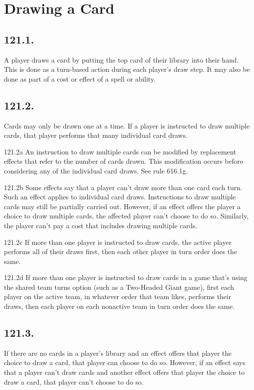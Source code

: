 \section{Drawing a Card}
\subsection*{121.1.}
A player draws a card by putting the top card of their library into their hand. This is done as a turn-based action during each player’s draw step. It may also be done as part of a cost or effect of a spell or ability.

\subsection*{121.2.}
Cards may only be drawn one at a time. If a player is instructed to draw multiple cards, that player performs that many individual card draws.

121.2a An instruction to draw multiple cards can be modified by replacement effects that refer to the number of cards drawn. This modification occurs before considering any of the individual card draws. See rule 616.1g.

121.2b Some effects say that a player can’t draw more than one card each turn. Such an effect applies to individual card draws. Instructions to draw multiple cards may still be partially carried out. However, if an effect offers the player a choice to draw multiple cards, the affected player can’t choose to do so. Similarly, the player can’t pay a cost that includes drawing multiple cards.

121.2c If more than one player is instructed to draw cards, the active player performs all of their draws first, then each other player in turn order does the same.

121.2d If more than one player is instructed to draw cards in a game that’s using the shared team turns option (such as a Two-Headed Giant game), first each player on the active team, in whatever order that team likes, performs their draws, then each player on each nonactive team in turn order does the same.

\subsection*{121.3.}
If there are no cards in a player’s library and an effect offers that player the choice to draw a card, that player can choose to do so. However, if an effect says that a player can’t draw cards and another effect offers that player the choice to draw a card, that player can’t choose to do so.

